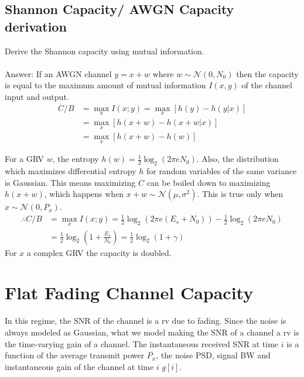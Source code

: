 \documentclass[12pt]{report} %
\begin{document}
\begin{mdframed}

  \subsection*{Shannon Capacity/ \gls{AWGN} Capacity derivation}
  Derive the Shannon capacity using mutual information.
  \\
  \\
  Answer: If an \gls{AWGN} channel $y = x + w$ where $w \sim \mathcal{N}(0,N_0)$
  then the capacity is equal to the maximum amount of mutual information
  $I(x,y)$ of the channel input and output.
  \begin{align}
    C/B & = \max_{x} I(x;y) = \max_{x} \left[h(y) - h(y|x) \right] \nonumber \\
        & = \max_{x} \left[h(x+w) - h(x+w|x) \right] \nonumber               \\
        & = \max_{x} \left[h(x+w) - h(w) \right] \nonumber
  \end{align}

  For a \gls{GRV} $w$, the entropy $h(w) = \frac{1}{2} \log_{2} (2 \pi e N_0)$.
  Also, the distribution which maximizes differential entropy $h$ for random
  variables of the same variance is Gaussian. This means maximizing $C$ can be
  boiled down to maximizing $h(x+w)$, which happens when $x+w \sim
    \mathcal{N}(\mu,\sigma^2)$. This is true only when $x \sim
    \mathcal{N}(0,P_x)$.
  \begin{align}
    \therefore C/B & = \max_{x} I(x;y) = \frac{1}{2} \log_{2}(2\pi e (E_s + N_0)) - \frac{1}{2} \log_{2} (2 \pi e N_0) \nonumber \\
                   & = \frac{1}{2} \log_{2}(1 + \frac{E_s}{N_0}) = \frac{1}{2} \log_{2}(1 + \gamma)
  \end{align}
  For $x$ a complex \gls{GRV} the capacity is doubled.
\end{mdframed}

\section{Flat Fading Channel Capacity}
In this regime, the \gls{SNR} of the channel is a \gls{rv} due to fading. Since the noise is always modeled as Gaussian, what we model making the  \gls{SNR} of a channel a  \gls{rv} is the time-varying gain of a channel. The instantaneous received \gls{SNR} at time $i$ is a function of the average transmit power $\overline{P_x}$, the noise \gls{PSD}, signal \gls{BW} and instantaneous gain of the channel at time $i$ $g[i]$.
\end{document}
